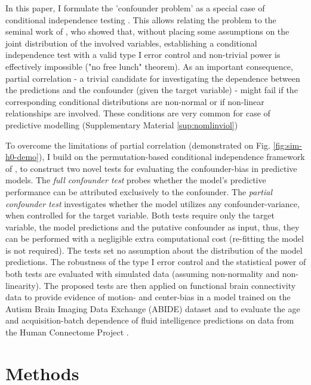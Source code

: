 \documentclass{article}
\begin{document}

In this paper, I formulate the 'confounder problem' as a special case of conditional independence testing \citep{dawid1979conditional}. This allows relating the problem to the seminal work of \cite{shah2020hardness}, who showed that, without placing some assumptions on the joint distribution of the involved variables, establishing a conditional independence test with a valid type I error control and non-trivial power is effectively impossible ("no free lunch" theorem). 
As an important consequence, partial correlation - a trivial candidate for investigating the dependence between the predictions and the confounder (given the target variable) - might fail if the corresponding conditional distributions are non-normal or if non-linear relationships are involved. These conditions are very common for case of predictive modelling \citep{garcia2009study, kristensen2017whole} (Supplementary Material \ref{sup:nomlinviol})

To overcome the limitations of partial correlation (demonstrated on Fig. \ref{fig:sim-h0-demo}), I build on the permutation-based conditional independence framework of \cite{berrett2020conditional}, to construct two novel tests for evaluating the confounder-bias in predictive models.
The \emph{full confounder test} probes whether the model's predictive performance can be attributed exclusively to the confounder.
The \emph{partial confounder test} investigates whether the model utilizes any confounder-variance, when controlled for the target variable.
Both tests require only the target variable, the model predictions and the putative confounder as input, thus, they can be performed with a negligible extra computational cost (re-fitting the model is not required).
The tests set no assumption about the distribution of the model predictions.
The robustness of the type I error control and the statistical power of both tests are evaluated with simulated data (assuming non-normality and non-linearity).
The proposed tests are then applied on functional brain connectivity data to provide evidence of motion- and center-bias in a model trained on the Autism Brain Imaging Data Exchange (ABIDE) dataset \citep{di2014autism} and to evaluate the age and acquisition-batch dependence of fluid intelligence predictions on data from the Human Connectome Project \citep{van2013wu}.

\section{Methods}
\end{document}
